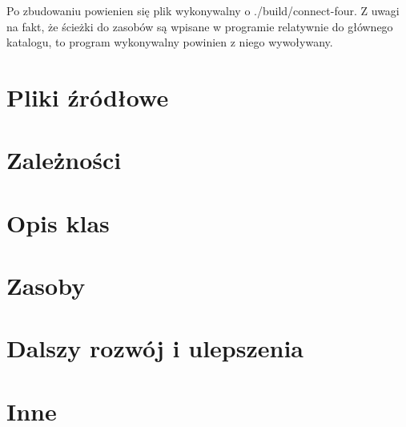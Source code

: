\documentclass{book}
\begin{document}
Po zbudowaniu powienien się plik wykonywalny o ./build/connect-four. 
Z uwagi na fakt, że ścieżki do zasobów są wpisane w programie relatywnie 
do głównego katalogu, to program wykonywalny powinien z niego wywoływany.

\section{Pliki źródłowe}

\section{Zależności}

\section{Opis klas}

\section{Zasoby}

\section{Dalszy rozwój i ulepszenia}

\section{Inne}
\end{document}

